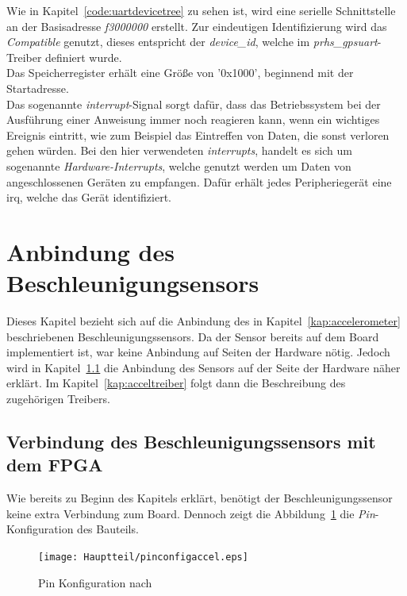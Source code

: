 Wie in Kapitel~\ref{code:uartdevicetree} zu sehen ist, wird eine serielle Schnittstelle an der Basisadresse \emph{f3000000} erstellt.
Zur eindeutigen Identifizierung wird das \emph{Compatible} genutzt, dieses entspricht der \emph{device\_id}, welche im
\emph{prhs\_gpsuart}-Treiber definiert wurde.\\
Das Speicherregister erhält eine Größe von '0x1000', beginnend mit der Startadresse. \\
Das sogenannte \emph{interrupt}-Signal sorgt dafür, dass das Betriebssystem bei der
Ausführung einer Anweisung immer noch reagieren kann, wenn ein wichtiges Ereignis eintritt,
wie zum Beispiel das Eintreffen von Daten, die sonst verloren gehen würden. Bei den hier
verwendeten \emph{interrupts}, handelt es sich um sogenannte \emph{Hardware-Interrupts}, welche genutzt werden
um Daten von angeschlossenen Geräten zu empfangen. Dafür erhält jedes Peripheriegerät
eine \ac{irq}, welche das Gerät identifiziert.\cite{computerlexikon}


\section{Anbindung des Beschleunigungsensors}\label{kap:implementierungaccel}

Dieses Kapitel bezieht sich auf die Anbindung des in Kapitel~\ref{kap:accelerometer} beschriebenen
 Beschleunigungssensors. Da der Sensor bereits auf dem Board implementiert ist, war keine Anbindung auf Seiten der Hardware nötig.
Jedoch wird in Kapitel~\ref{kap:accelimplementierung} die Anbindung des Sensors auf der Seite der Hardware
näher erklärt. Im Kapitel~\ref{kap:acceltreiber} folgt dann die Beschreibung des zugehörigen Treibers.

\subsection{Verbindung des Beschleunigungssensors mit dem FPGA}\label{kap:accelimplementierung}

Wie bereits zu Beginn des Kapitels erklärt, benötigt der Beschleunigungssensor keine extra Verbindung zum Board.
Dennoch zeigt die Abbildung~\ref{fig:pinconfigaccel} die \emph{Pin}-Konfiguration des Bauteils.

\begin{figure}[h!]
\centering
\texttt{[image: Hauptteil/pinconfigaccel.eps]}
\caption{Pin Konfiguration nach \cite{accelerometer} }
\label{fig:pinconfigaccel}
\end{figure}

